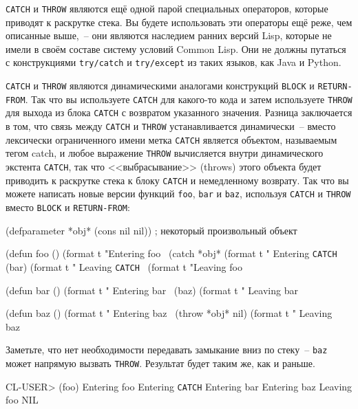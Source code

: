 \lstinline{CATCH} и \lstinline{THROW} являются ещё одной парой специальных операторов, которые
приводят к раскрутке стека.  Вы будете использовать эти операторы ещё реже, чем описанные
выше,~-- они являются наследием ранних версий Lisp, которые не имели в своём составе
систему условий Common Lisp.  Они не должны путаться с конструкциями \lstinline{try/catch} и
\lstinline{try/except} из таких языков, как Java и Python.

\lstinline{CATCH} и \lstinline{THROW} являются динамическими аналогами конструкций \lstinline{BLOCK} и
\lstinline{RETURN-FROM}.  Так что вы используете \lstinline{CATCH} для какого-то кода и затем
используете \lstinline{THROW} для выхода из блока \lstinline{CATCH} с возвратом указанного значения.
Разница заключается в том, что связь между \lstinline{CATCH} и \lstinline{THROW} устанавливается
динамически~-- вместо лексически ограниченного имени метка \lstinline{CATCH} является
объектом, называемым тегом catch, и любое выражение \lstinline{THROW} вычисляется внутри
динамического экстента \lstinline{CATCH}, так что <<выбрасывание>> (throws) этого объекта будет
приводить к раскрутке стека к блоку \lstinline{CATCH} и немедленному возврату.  Так
что вы можете написать новые версии функций \lstinline{foo}, \lstinline{bar} и \lstinline{baz}, используя
\lstinline{CATCH} и \lstinline{THROW} вместо \lstinline{BLOCK} и \lstinline{RETURN-FROM}:

\begin{myverb}
(defparameter *obj* (cons nil nil)) ; некоторый произвольный объект

(defun foo ()
  (format t "Entering foo~%
  (catch *obj*
    (format t " Entering \lstinline{CATCH}~%
    (bar)
    (format t " Leaving \lstinline{CATCH}~%
  (format t "Leaving foo~%

(defun bar ()
  (format t "  Entering bar~%
  (baz)
  (format t "  Leaving bar~%

(defun baz ()
  (format t "   Entering baz~%
  (throw *obj* nil)
  (format t "   Leaving baz~%
\end{myverb}

Заметьте, что нет необходимости передавать замыкание вниз по стеку~-- \lstinline{baz} может
напрямую вызвать \lstinline{THROW}.  Результат будет таким же, как и раньше.

\begin{myverb}
  CL-USER> (foo)
  Entering foo
   Entering \lstinline{CATCH}
    Entering bar
     Entering baz
  Leaving foo
  NIL
\end{myverb}

